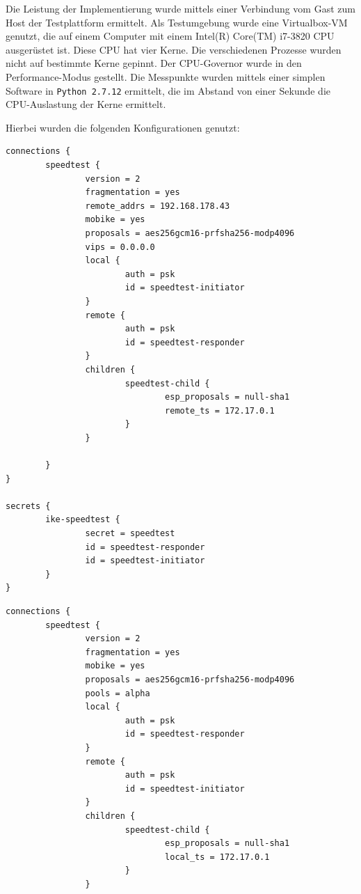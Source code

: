 {Die Leistung der Implementierung wurde mittels einer Verbindung vom Gast zum Host der Testplattform ermittelt.
Als Testumgebung wurde eine Virtualbox-\ac{VM} genutzt, die auf einem Computer
mit einem Intel(R) Core(TM) i7-3820 CPU ausgerüstet ist. Diese \ac{CPU} hat vier Kerne.
Die verschiedenen Prozesse wurden nicht auf bestimmte Kerne gepinnt. Der \ac{CPU}-Governor
wurde in den Performance-Modus gestellt. Die Messpunkte
wurden mittels einer simplen Software in \texttt{Python 2.7.12} ermittelt, die im Abstand
von einer Sekunde die CPU-Auslastung der Kerne ermittelt.

Hierbei wurden die folgenden Konfigurationen genutzt:
\begin{lstlisting}[label=lst:speedtest-initiator-config,caption=Initiator-Konfiguration für den Geschwindigkeitstest]
connections {
        speedtest {
                version = 2
                fragmentation = yes
                remote_addrs = 192.168.178.43
                mobike = yes
                proposals = aes256gcm16-prfsha256-modp4096
                vips = 0.0.0.0
                local {
                        auth = psk
                        id = speedtest-initiator
                }
                remote {
                        auth = psk
                        id = speedtest-responder
                }
                children {
                        speedtest-child {
                                esp_proposals = null-sha1
                                remote_ts = 172.17.0.1
                        }
                }

        }
}

secrets {
        ike-speedtest {
                secret = speedtest
                id = speedtest-responder
                id = speedtest-initiator
        }
}
\end{lstlisting}
\begin{lstlisting}[label=lst:speedtest-responder-config,caption=Responder-Konfiguration für den Geschwindigkeitstest]
connections {
        speedtest {
                version = 2
                fragmentation = yes
                mobike = yes
                proposals = aes256gcm16-prfsha256-modp4096
                pools = alpha
                local {
                        auth = psk
                        id = speedtest-responder
                }
                remote {
                        auth = psk
                        id = speedtest-initiator
                }
                children {
                        speedtest-child {
                                esp_proposals = null-sha1
                                local_ts = 172.17.0.1
                        }
                }
                

\end{lstlisting}}
